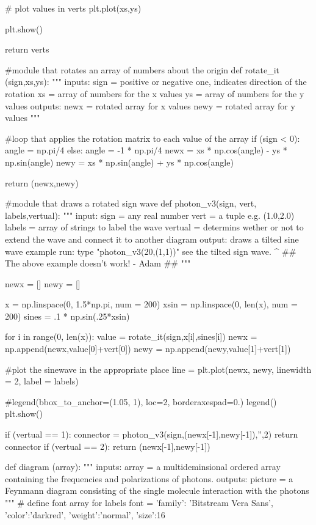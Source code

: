 \documentclass[11pt,a4paper,notitlepage]{article}
\begin{document}
\begin{code}
    # plot values in verts
    plt.plot(xs,ys)
    
    plt.show()
    
    return verts

#module that rotates an array of numbers about the origin
def rotate_it (sign,xs,ys):
    """
    inputs:
        sign = positive or negative one, indicates direction of the rotation
        xs = array of numbers for the x values 
        ys = array of numbers for the y values
    outputs:
        newx = rotated array for x values
        newy = rotated array for y values
    """
    
    #loop that applies the rotation matrix to each value of the array
    if (sign < 0):
        angle = np.pi/4
    else:
        angle = -1 * np.pi/4
    newx = xs * np.cos(angle) - ys * np.sin(angle)
    newy = xs * np.sin(angle) + ys * np.cos(angle)
    
    return (newx,newy)

#module that draws a rotated sign wave
def photon_v3(sign, vert, labels,vertual):
    """
    input:
        sign = any real number
        vert = a tuple e.g. (1.0,2.0)
        labels = array of strings to label the wave
        vertual = determins wether or not to extend the wave
            and connect it to another diagram
    output:
        draws a tilted sine wave
    example run:
        type "photon_v3(20,(1,1))" see the tilted sign wave.
        ^ ## The above example doesn't work! - Adam ##
    """
    
    newx = []
    newy = []
    
    x = np.linspace(0, 1.5*np.pi, num = 200)
    xsin = np.linspace(0, len(x), num = 200)
    sines = .1 * np.sin(.25*xsin)
    
    for i in range(0, len(x)):
        value = rotate_it(sign,x[i],sines[i])
        newx = np.append(newx,value[0]+vert[0])
        newy = np.append(newy,value[1]+vert[1])
        
    #plot the sinewave in the appropriate place
    line = plt.plot(newx,
                     newy,
                     linewidth = 2,
                     label = labels)
        

    #legend(bbox_to_anchor=(1.05, 1), loc=2, borderaxespad=0.)
    legend()
    plt.show()
    
    if (vertual == 1):
        connector = photon_v3(sign,(newx[-1],newy[-1]),'',2)
        return connector
    if (vertual == 2):
        return (newx[-1],newy[-1])

def diagram (array):
    """
    inputs:
        array = a multideminsional ordered array containing the frequencies and 
            polarizations of photons.
    outputs:
        picture = a Feynmann diagram consisting of the single molecule 
            interaction with the photons
    """
    # define font array for labels
    font = {'family': 'Bitstream Vera Sans',
            'color':'darkred',
            'weight':'normal',
            'size':16}
    

\end{code}
\end{document}
